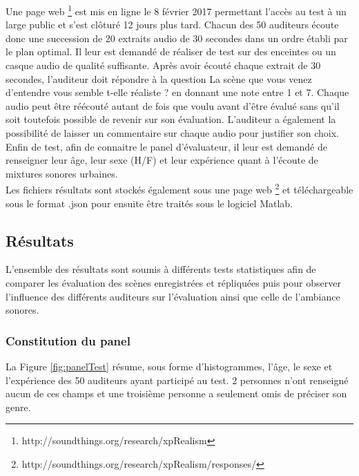 Une page web \footnote{http://soundthings.org/research/xpRealism} est mis en ligne le 8 février 2017 permettant l'accès au test à un large public et s'est clôturé 12 jours plus tard. Chacun des 50 auditeurs écoute donc une succession de 20 extraits audio de 30 secondes dans un ordre établi par le plan optimal. Il leur est demandé de réaliser de test sur des enceintes ou un casque audio de qualité suffisante. Après avoir écouté chaque extrait de 30 secondes, l'auditeur doit répondre à la question \og La scène que vous venez d'entendre vous semble t-elle réaliste ? \fg{} en donnant une note entre 1 et 7. Chaque audio peut être réécouté autant de fois que voulu avant d'être évalué sans qu'il soit toutefois possible de revenir sur son évaluation. L'auditeur a également la possibilité de laisser un commentaire sur chaque audio pour justifier son choix. Enfin de test, afin de connaitre le panel d'évaluateur, il leur est demandé de renseigner leur âge, leur sexe (H/F) et leur expérience quant à l'écoute de mixtures sonores urbaines.\\

Les fichiers résultats sont stockés également sous une page web \footnote{http://soundthings.org/research/xpRealism/responses/} et téléchargeable sous le format .json pour ensuite être traités sous le logiciel Matlab.\\

\subsection{Résultats}

L'ensemble des résultats sont soumis à différents tests statistiques afin de comparer les évaluation des scènes enregistrées et répliquées puis pour observer l'influence des différents auditeurs sur l'évaluation ainsi que celle de l'ambiance sonores.

\subsubsection{Constitution du panel}

La Figure \ref{fig:panelTest} résume, sous forme d'histogrammes, l'âge, le sexe et l'expérience des 50 auditeurs ayant participé au test. 2 personnes n'ont renseigné aucun de ces champs et une troisième personne a seulement omis de préciser son genre.\\

